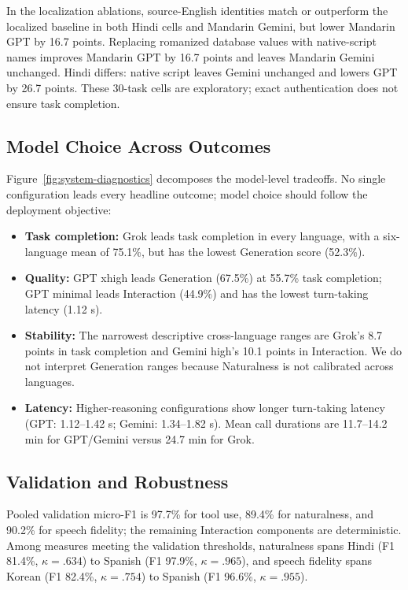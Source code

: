 \documentclass{article}
\begin{document}
In the localization ablations, source-English identities match or
outperform the localized baseline in both Hindi cells and Mandarin Gemini, but
lower Mandarin GPT by 16.7 points. Replacing romanized database values with
native-script names improves Mandarin GPT by 16.7 points and leaves Mandarin
Gemini unchanged. Hindi differs: native script leaves Gemini unchanged and
lowers GPT by 26.7 points. These 30-task cells are exploratory; exact
authentication does not ensure task completion.

\subsection{Model Choice Across Outcomes}
\label{sec:results-models}

Figure~\ref{fig:system-diagnostics} decomposes the model-level tradeoffs.
No single configuration leads every headline outcome; model choice should
follow the deployment objective:
\begin{itemize}[leftmargin=1em,labelsep=.35em,topsep=0pt,partopsep=0pt,
itemsep=1pt,parsep=0pt]
\item \textbf{Task completion:} Grok leads task completion in every language,
with a six-language mean of 75.1\%, but has the lowest Generation score
(52.3\%).
\item \textbf{Quality:} GPT xhigh leads Generation (67.5\%) at 55.7\% task
completion; GPT minimal leads Interaction (44.9\%) and has the lowest
turn-taking latency (1.12 s).
\item \textbf{Stability:} The narrowest descriptive cross-language ranges are
Grok's 8.7 points in task completion and Gemini high's 10.1 points in
Interaction. We do not interpret Generation ranges because Naturalness is not
calibrated across languages.
\item \textbf{Latency:} Higher-reasoning configurations show longer
turn-taking latency (GPT: 1.12--1.42 s; Gemini: 1.34--1.82 s). Mean call
durations are 11.7--14.2 min for GPT/Gemini versus 24.7 min for Grok.
\end{itemize}

\subsection{Validation and Robustness}
\label{sec:results-validation}

Pooled validation micro-F1 is 97.7\% for tool use, 89.4\% for naturalness,
and 90.2\% for speech fidelity; the remaining Interaction components are
deterministic.
Among measures meeting the validation thresholds, naturalness spans Hindi (F1 81.4\%,
$\kappa=.634$) to Spanish (F1 97.9\%, $\kappa=.965$), and speech fidelity spans
Korean (F1 82.4\%, $\kappa=.754$) to Spanish (F1 96.6\%, $\kappa=.955$).
\end{document}

